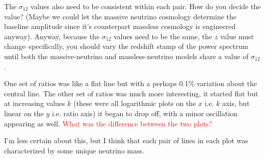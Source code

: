 \documentclass[11pt]{article}
\begin{document}
The $\sigma_{12}$ values also need to be consistent within each pair. How do you decide the value? (Maybe we could let the massive neutrino cosmology determine the baseline amplitude since it's counterpart massless cosmology is engineered anyway). Anyway, because the $\sigma_{12}$ values need to be the same, the $z$ value must change--specifically, you should vary the redshift stamp of the power spectrum until both the massive-neutrino and massless-neutrino models share a value of $\sigma_{12}$.

One set of ratios was like a flat line but with a perhaps 0.1\% variation about the central line. The other set of ratios was much more interesting, it started flat but at increasing values $k$ (these were all logarithmic plots on the $x$ i.e. $k$ axis, but linear on the $y$ i.e. ratio axis) it began to drop off, with a minor oscillation appearing as well. \textcolor{red}{What was the difference between the two plots?}

I'm less certain about this, but I think that each pair of lines in each plot was characterized by some unique neutrino mass.




\end{document}
